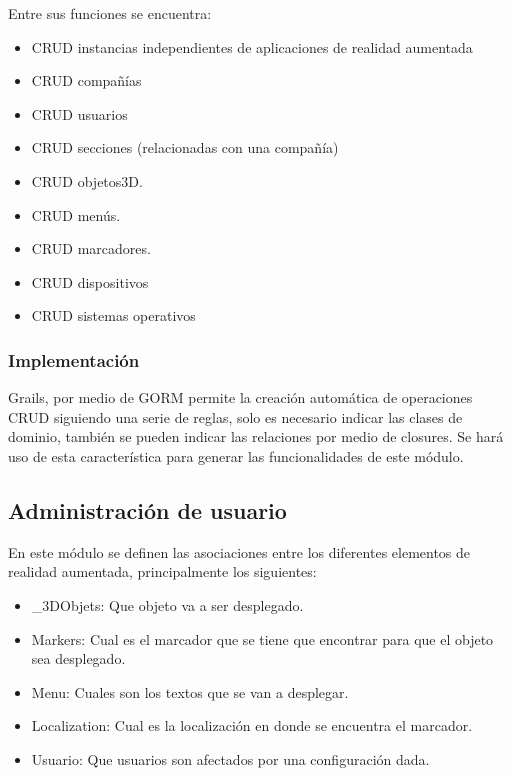 \documentclass[12pt,a4paper,spanish,openany]{book}
\begin{document}
Entre sus funciones se encuentra: 

\begin{itemize}
  \item CRUD instancias independientes
  de aplicaciones de realidad aumentada
  \item CRUD compañías
  \item CRUD usuarios
  \item CRUD secciones (relacionadas con una compañía)
  \item CRUD objetos3D.
  \item CRUD menús.
  \item CRUD marcadores.
  \item CRUD dispositivos
  \item CRUD sistemas operativos
\end{itemize}

\subsubsection{Implementación}

Grails, por medio de GORM permite la creación automática de operaciones CRUD
siguiendo una serie de reglas, solo es necesario indicar las clases de dominio,
también se pueden indicar las relaciones por medio de closures. Se hará uso de
esta característica para generar las funcionalidades de este módulo.


\subsection{Administración de usuario}
En este módulo se definen las asociaciones entre los diferentes elementos de
realidad aumentada, principalmente los siguientes:
\begin{itemize}
  \item \_3DObjets: Que objeto va a ser desplegado.
  \item Markers: Cual es el marcador que se tiene que encontrar para que el
  objeto sea desplegado.
  \item Menu: Cuales son los textos que se van a desplegar.
  \item Localization: Cual es la localización en donde se encuentra el marcador.
  \item Usuario: Que usuarios son afectados por una configuración dada.
\end{itemize}
\end{document}
